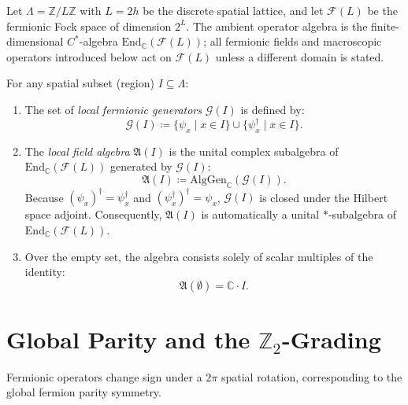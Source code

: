 Let $\Lambda = \mathbb{Z}/L\mathbb{Z}$ with $L = 2h$ be the discrete spatial lattice, and let $\mathcal{F}(L)$ be the fermionic Fock space of dimension $2^L$. The ambient operator algebra is the finite-dimensional $C^*$-algebra $\mathrm{End}_{\mathbb{C}}(\mathcal{F}(L))$; all fermionic fields and macroscopic operators introduced below act on $\mathcal{F}(L)$ unless a different domain is stated.

\begin{definition}
For any spatial subset (region) $I \subseteq \Lambda$:
\begin{enumerate}
    \item The set of \emph{local fermionic generators} $\mathcal{G}(I)$ is defined by:
    \begin{equation}
    \mathcal{G}(I) \coloneqq \{ \psi_x \mid x \in I \} \cup \{ \psi_x^\dagger \mid x \in I \}.
    \end{equation}
    \item The \emph{local field algebra} $\mathfrak{A}(I)$ is the unital complex subalgebra of $\mathrm{End}_{\mathbb{C}}(\mathcal{F}(L))$ generated by $\mathcal{G}(I)$:
    \begin{equation}
    \mathfrak{A}(I) \coloneqq \mathrm{AlgGen}_{\mathbb{C}}(\mathcal{G}(I)).
    \end{equation}
    Because $(\psi_x)^\dagger = \psi_x^\dagger$ and $(\psi_x^\dagger)^\dagger = \psi_x$, $\mathcal{G}(I)$ is closed under the Hilbert space adjoint. Consequently, $\mathfrak{A}(I)$ is automatically a unital $*$-subalgebra of $\mathrm{End}_{\mathbb{C}}(\mathcal{F}(L))$.
    \item Over the empty set, the algebra consists solely of scalar multiples of the identity:
    \begin{equation}
    \mathfrak{A}(\emptyset) = \mathbb{C} \cdot I.
    \end{equation}
\end{enumerate}
\end{definition}

\section[Global Parity and the Z2-Grading]{Global Parity and the $\mathbb{Z}_2$-Grading}

Fermionic operators change sign under a $2\pi$ spatial rotation, corresponding to the global fermion parity symmetry.

